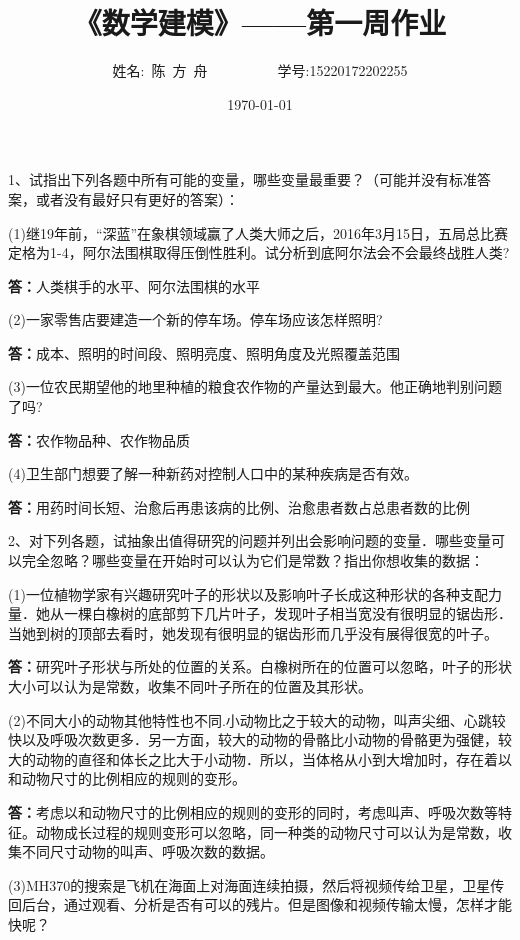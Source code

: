 \documentclass[UTF8,a4paper,12pt]{article} %
\newcommand{\hei}{\CJKfamily{hei}}  %
\begin{document}
\title{\hei 《数学建模》——第一周作业}
\date{\today}
\author{姓名:~陈~方~舟~~~~~~~~~~学号:15220172202255}
\maketitle

1、试指出下列各题中所有可能的变量，哪些变量最重要？（可能并没有标准答案，或者没有最好只有更好的答案）：

(1)继19年前，“深蓝”在象棋领域赢了人类大师之后，2016年3月15日，五局总比赛定格为1-4，阿尔法围棋取得压倒性胜利。试分析到底阿尔法会不会最终战胜人类?

\textbf{答：}人类棋手的水平、阿尔法围棋的水平

(2)一家零售店要建造一个新的停车场。停车场应该怎样照明? 

\textbf{答：}成本、照明的时间段、照明亮度、照明角度及光照覆盖范围

(3)一位农民期望他的地里种植的粮食农作物的产量达到最大。他正确地判别问题了吗?

\textbf{答：}农作物品种、农作物品质

(4)卫生部门想要了解一种新药对控制人口中的某种疾病是否有效。

\textbf{答：}用药时间长短、治愈后再患该病的比例、治愈患者数占总患者数的比例

2、对下列各题，试抽象出值得研究的问题并列出会影响问题的变量．哪些变量可以完全忽略？哪些变量在开始时可以认为它们是常数？指出你想收集的数据： 

(1)一位植物学家有兴趣研究叶子的形状以及影响叶子长成这种形状的各种支配力量．她从一棵白橡树的底部剪下几片叶子，发现叶子相当宽没有很明显的锯齿形．当她到树的顶部去看时，她发现有很明显的锯齿形而几乎没有展得很宽的叶子。 

\textbf{答：}研究叶子形状与所处的位置的关系。白橡树所在的位置可以忽略，叶子的形状大小可以认为是常数，收集不同叶子所在的位置及其形状。

(2)不同大小的动物其他特性也不同.小动物比之于较大的动物，叫声尖细、心跳较快以及呼吸次数更多．另一方面，较大的动物的骨骼比小动物的骨骼更为强健，较大的动物的直径和体长之比大于小动物．所以，当体格从小到大增加时，存在着以和动物尺寸的比例相应的规则的变形。 

\textbf{答：}考虑以和动物尺寸的比例相应的规则的变形的同时，考虑叫声、呼吸次数等特征。动物成长过程的规则变形可以忽略，同一种类的动物尺寸可以认为是常数，收集不同尺寸动物的叫声、呼吸次数的数据。

(3)MH370的搜索是飞机在海面上对海面连续拍摄，然后将视频传给卫星，卫星传回后台，通过观看、分析是否有可以的残片。但是图像和视频传输太慢，怎样才能快呢？ 
\end{document}
